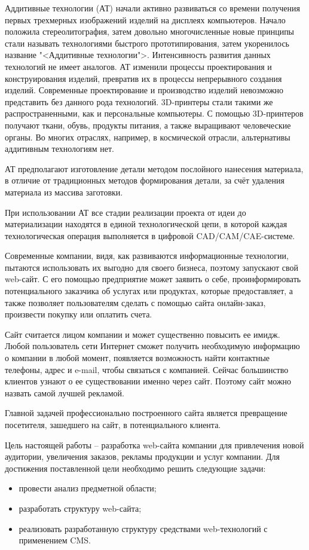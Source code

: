 \newsection
{}

Аддитивные технологии (АТ) начали активно развиваться со времени получения первых трехмерных изображений изделий на дисплеях компьютеров. Начало положила стереолитография, затем довольно многочисленные новые принципы стали называть технологиями быстрого прототипирования, затем укоренилось название "<Аддитивные технологии">. Интенсивность развития данных технологий не имеет аналогов. АТ изменили процессы проектирования и конструирования изделий, превратив их в процессы непрерывного создания изделий. Современные проектирование и производство изделий невозможно представить без данного рода технологий. 3D-принтеры стали такими же распространенными, как и персональные компьютеры. С помощью 3D-принтеров получают ткани, обувь, продукты питания, а также выращивают человеческие органы. Во многих отраслях, например, в космической отрасли, альтернативы аддитивным технологиям нет.

АТ предполагают изготовление детали методом послойного нанесения материала, в отличие от традиционных методов формирования детали, за счёт удаления материала из массива заготовки.

При использовании АТ все стадии реализации проекта от идеи до материализации находятся в единой технологической цепи, в которой каждая технологическая операция выполняется в цифровой CAD/CAM/CAE-системе.

Современные компании, видя, как развиваются информационные технологии, пытаются использовать их выгодно для своего бизнеса, поэтому запускают свой web-сайт. С его помощью предприятие может заявить о себе, проинформировать потенциального заказчика об услугах или продуктах, которые предоставляет, а также позволяет пользователям сделать с помощью сайта онлайн-заказ, произвести покупку или оплатить счета.

Сайт считается лицом компании и может существенно повысить ее имидж. Любой пользователь сети Интернет сможет получить необходимую информацию о компании в любой момент, появляется возможность найти контактные телефоны, адрес и e-mail, чтобы связаться с компанией. Сейчас большинство клиентов узнают о ее существовании именно через сайт. Поэтому сайт можно назвать самой лучшей рекламой. 

Главной задачей профессионально построенного сайта является превращение посетителя, зашедшего на сайт, в потенциального клиента.

Цель настоящей работы – разработка web-сайта компании для привлечения новой аудитории, увеличения заказов, рекламы продукции и услуг компании. Для достижения поставленной цели необходимо решить следующие задачи:
\begin{itemize}
\item провести анализ предметной области;
\item разработать структуру web-сайта;
\item реализовать разработанную структуру средствами web-технологий с применением CMS.
\end{itemize}

